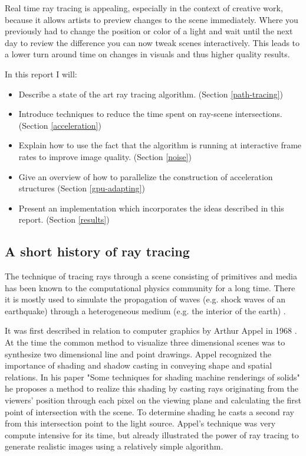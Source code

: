 \documentclass{ACGSeminar}
\begin{document}
Real time ray tracing is appealing, especially in the context of creative work, because it allows artists to preview changes to the scene immediately. Where you previously had to change the position or color of a light and wait until the next day to review the difference you can now tweak scenes interactively. This leads to a lower turn around time on changes in visuals and thus higher quality results.

In this report I will:
\begin{itemize}
\item Describe a state of the art ray tracing algorithm. (Section \ref{path-tracing})
\item Introduce techniques to reduce the time spent on ray-scene intersections. (Section \ref{acceleration})
\item Explain how to use the fact that the algorithm is running at interactive frame rates to improve image quality. (Section \ref{noise})
\item Give an overview of how to parallelize the construction of acceleration structures (Section \ref{gpu-adapting}) 
\item Present an implementation which incorporates the ideas described in this report. (Section \ref{results})
\end{itemize}


\subsection{A short history of ray tracing}
The technique of tracing rays through a scene consisting of primitives and media has been known to the computational physics community for a long time. There it is mostly used to simulate the propagation of waves (e.g. shock waves of an earthquake) through a heterogeneous medium (e.g. the interior of the earth) \cite{GJI:GJI93}.

It was first described in relation to computer graphics by Arthur Appel in 1968  \cite{Appel68}. At the time the common method to visualize three dimensional scenes was to synthesize two dimensional line and point drawings. Appel recognized the importance of shading and shadow casting in conveying shape and spatial relations. In his paper "Some techniques for shading machine renderings of solids" he proposes a method to realize this shading by casting rays originating from the viewers' position through each pixel on the viewing plane and calculating the first point of intersection with the scene. To determine shading he casts a second ray from this intersection point to the light source. Appel's technique was very compute intensive for its time, but already illustrated the power of ray tracing to generate realistic images using a relatively simple algorithm.
\end{document}
